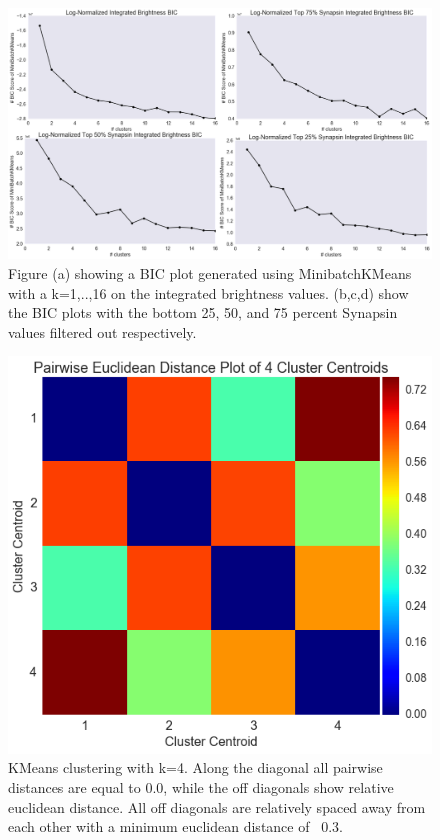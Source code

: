 \documentclass{article}
\begin{document}
\newpage
\begin{figure}
  \centering
  \includegraphics[width=\textwidth]{figures/exploratory/logbicplot.png}
  \caption{Figure (a) showing a BIC plot generated using MinibatchKMeans with a k={1,..,16} on the integrated brightness values. (b,c,d) show the BIC plots with the bottom 25, 50, and 75 percent Synapsin values filtered out respectively.}
  \label{fig:figure4}
\end{figure}

\begin{figure}
  \centering
  \includegraphics[scale=0.5]{figures/cluster4pairwisedistance.png}
  \caption{KMeans clustering with k=4. Along the diagonal all pairwise distances are equal to 0.0, while the off diagonals show relative euclidean distance. All off diagonals are relatively spaced away from each other with a minimum euclidean distance of ~0.3.}
  \label{fig:figure5}
\end{figure}
\end{document}
